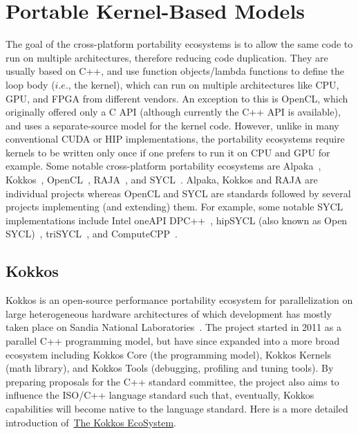 \section{Portable Kernel-Based Models}


\par
The goal of the cross-platform portability ecosystems is to allow the same code to run on multiple architectures, therefore reducing code duplication.
They are usually based on C++, and use function objects/lambda functions to define the loop body ($i.e.$, the kernel), which can run on multiple architectures like CPU, GPU, and FPGA from different vendors.
An exception to this is OpenCL, which originally offered only a C API (although currently the C++ API is available), and uses a separate-source model for the kernel code. 
However, unlike in many conventional CUDA or HIP implementations, the portability ecosystems require kernels to be written only once if one prefers to run it on CPU and GPU for example.
Some notable cross-platform portability ecosystems are Alpaka~\cite{alpaka}, Kokkos~\cite{kokkos}, OpenCL~\cite{OpenCL}, RAJA~\cite{raja}, and SYCL~\cite{sycl}.
Alpaka, Kokkos and RAJA are individual projects whereas OpenCL and SYCL are standards followed by several projects implementing (and extending) them.
For example, some notable SYCL implementations include Intel oneAPI DPC++~\cite{oneapi-dpc}, hipSYCL (also known as Open SYCL)~\cite{hipsycl}, triSYCL~\cite{trisycl}, and ComputeCPP~\cite{computecpp}.




\subsection{Kokkos}


\par
Kokkos is an open-source performance portability ecosystem for parallelization on large heterogeneous hardware architectures of which development has mostly taken place on Sandia National Laboratories~\cite{kokkos, kokkos_sandia}.
The project started in 2011 as a parallel C++ programming model, but have since expanded into a more broad ecosystem including Kokkos Core (the programming model), Kokkos Kernels (math library), and Kokkos Tools (debugging, profiling and tuning tools).
By preparing proposals for the C++ standard committee, the project also aims to influence the ISO/C++ language standard such that, eventually, Kokkos capabilities will become native to the language standard.
Here is a more detailed introduction of~\href{https://www.sandia.gov/news/publications/hpc-annual-reports/article/kokkos/}{The Kokkos EcoSystem}.



